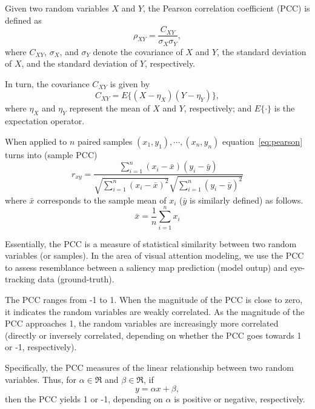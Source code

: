Given two random variables $X$ and $Y$, the Pearson correlation coefficient (PCC) is defined as 
\begin{equation}
  \rho_{XY} = \frac{C_{XY}}{\sigma_X\sigma_Y},
  \label{eq:pearson}
\end{equation}
where $C_{XY}$, $\sigma_X$, and $\sigma_Y$ denote the covariance of $X$ and $Y$, the standard deviation of $X$, and the standard deviation of $Y$, respectively.

In turn, the covariance $C_{XY}$ is given by
\begin{equation}
  C_{XY} = E\{(X-\eta_X)(Y - \eta_Y)\},
  \label{eq:cov}
\end{equation}
where $\eta_X$ and $\eta_Y$ represent the mean of $X$ and $Y$, respectively; and $E\{\cdot\}$ is the expectation operator.

When applied to $n$ paired samples $(x_1,y_1),\cdots,(x_n,y_n)$ equation~\ref{eq:pearson} turns into (sample PCC)
\begin{equation}
  r_{xy} = \frac{\sum_{i=1}^n(x_i-\bar x)(y_i - \bar y)}{\sqrt{\sum_{i=1}^n(x_i-\bar x)^2}\sqrt{\sum_{i=1}^n(y_i-\bar y)^2}}
\end{equation}
where $\bar x$ corresponds to the sample mean of $x_i$ ($\bar y$ is similarly defined) as follows.
\begin{equation}
  \bar x = \frac{1}{n}\sum_{i=1}^n x_i
  \label{eq:xsamplemean}
\end{equation}

Essentially, the PCC is a measure of statistical similarity between two random variables (or samples). In the area of visual attention modeling, we use the PCC to assess resemblance between a saliency map prediction (model outup) and eye-tracking data (ground-truth).

The PCC ranges from -1 to 1. When the magnitude of the PCC is close to zero, it indicates the random variables are weakly correlated. As the magnitude of the PCC approaches 1, the random variables are increasingly more correlated (directly or inversely correlated, depending on whether the PCC goes towards 1 or -1, respectively).

Specifically, the PCC measures of the linear relationship between two random variables. Thus, for $\alpha \in \Re$ and $\beta \in \Re$, if 
\begin{equation}
	y = \alpha x + \beta,
	\label{eq:afim}
\end{equation}
then the PCC yields 1 or -1, depending on $\alpha$ is positive or negative, respectively.

